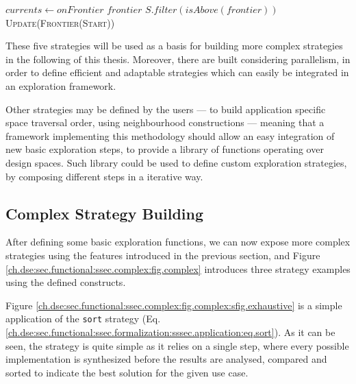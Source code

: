 \begin{algorithm}[ht!]
{\begin{minipage}{1.0\linewidth}
\begin{algorithmic}[1]
                                    \State $currents \leftarrow onFrontier$
                                \EndWhile
                                \State \Return $frontier$ 
                            \EndProcedure
                                \State \Return $S.filter(isAbove(frontier))$
                            \EndProcedure
                            \State \Return \textsc{Update}(\textsc{Frontier}(\textsc{Start}))
                        \EndProcedure
                    \end{algorithmic}
                \end{minipage}
            }
        \end{algorithm}

\clearpage
        These five strategies will be used as a basis for building more complex strategies in the following of this thesis.
        Moreover, there are built considering parallelism, in order to define efficient and adaptable strategies which can easily be integrated in an exploration framework.

        Other strategies may be defined by the users --- \eg to build application specific space traversal order, using neighbourhood constructions --- meaning that a framework implementing this methodology should allow an easy integration of new basic exploration steps, to provide a library of functions operating over design spaces.
        Such library could be used to define custom exploration strategies, by composing different steps in a iterative way.

    \subsection{Complex Strategy Building}
    \label{ch.dse:sec.functional:ssec.complex}

        After defining some basic exploration functions, we can now expose more complex strategies using the features introduced in the previous section, and Figure \ref{ch.dse:sec.functional:ssec.complex:fig.complex} introduces three strategy examples using the defined constructs.

        Figure \ref{ch.dse:sec.functional:ssec.complex:fig.complex:sfig.exhaustive} is a simple application of the {\tt sort} strategy (Eq. \ref{ch.dse:sec.functional:ssec.formalization:sssec.application:eq.sort}).
        As it can be seen, the strategy is quite simple as it relies on a single step, where every possible implementation is synthesized before the results are analysed, compared and sorted to indicate the best solution for the given use case.

